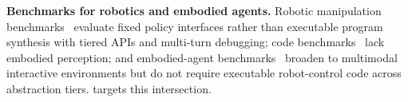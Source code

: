 \textbf{Benchmarks for robotics and embodied agents.}
Robotic manipulation benchmarks~\citep{zhu2020robosuite, liu2023libero, li2024behavior1k, mees2022calvin, james2019rlbench, yu2020metaworld} evaluate fixed policy interfaces rather than executable program synthesis with tiered APIs and multi-turn debugging; code benchmarks~\citep{chen2021codex, jimenez2024swebench, pan2024training} lack embodied perception; and embodied-agent benchmarks~\citep{yang2025embodiedbench, chen2025g1, wang2026visgym, liu2024agentbench, shridhar2020alfred} broaden to multimodal interactive environments but do not require executable robot-control code across abstraction tiers. \gymname{} targets this intersection.
